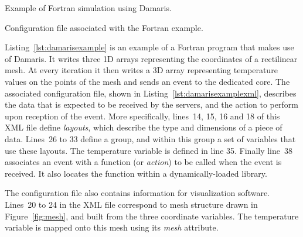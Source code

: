 \begin{Listing}[h]
	
	\caption[Example of Fortran simulation using Damaris]{Example of Fortran simulation using Damaris.}
	\label{lst:damarisexample}
\end{Listing}

\begin{Listing}[h]
	
	\caption[Configuration file associated with the Fortran example]{Configuration file associated with the Fortran example.}
	\label{lst:damarisexamplexml}
\end{Listing}

Listing~\ref{lst:damarisexample} is an example of a Fortran program 
that makes use of Damaris. It writes three 1D arrays representing the coordinates of a rectilinear mesh.
At every iteration it then writes
a 3D array representing temperature values on the points of the mesh and sends an event to the dedicated core.
The associated configuration file, shown in Listing~\ref{lst:damarisexamplexml},
describes the data that is expected to be received by the servers, and the
action to perform upon reception of the event. More specifically, lines~14, 15, 16 and 18 of this XML file 
define \emph{layouts}, which describe the type and dimensions of a piece of data. Lines~26 to 33 define a group,
and within this group a set of variables that use these layouts. The temperature variable is defined in line 35.
Finally line~38 associates an event with a function (or \emph{action}) to be
called when the event is received. It also locates the function within a dynamically-loaded library.

The configuration file also contains information for visualization software.
Lines~20 to 24 in the XML file correspond to mesh structure drawn in 
Figure~\ref{fig:mesh}, and built from the three coordinate variables. 
The temperature variable is mapped onto this mesh using its \emph{mesh} attribute.
